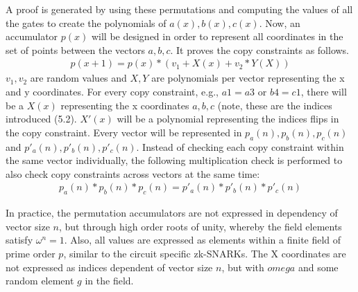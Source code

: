 A proof is generated by using these permutations and computing the values of all the gates to create the polynomials of \(a(x), b(x), c(x)\). Now, an accumulator \(p(x)\) will be designed in order to represent all coordinates in the set of points between the vectors \(a, b, c\). It proves the copy constraints as follows.
\begin{align}
    p(x+1) = p(x) * (v_1 + X(x) + v_2 * Y(X))
\end{align}
\(v_1, v_2\) are random values and \(X, Y\) are polynomials per vector representing the x and y coordinates. For every copy constraint, e.g., \(a1=a3\) or \(b4=c1\), there will be a \(X(x)\) representing the x coordinates \(a,b ,c\) (note, these are the indices introduced (5.2). \(X'(x)\) will be a polynomial representing the indices flips in the copy constraint. Every vector will be represented in \(p_{a}(n), p_{b}(n), p_{c}(n)\) and \(p'_{a}(n), p'_{b}(n), p'_{c}(n)\). Instead of checking each copy constraint within the same vector individually, the following multiplication check is performed to also check copy constraints across vectors at the same time:
\begin{align}
    p_{a}(n) * p_{b}(n) * p_{c}(n) = p'_{a}(n) * p'_{b}(n) * p'_{c}(n)
\end{align}

In practice, the permutation accumulators are not expressed in dependency of vector size \(n\), but through high order roots of unity, whereby the field elements satisfy \(\omega^n = 1\). Also, all values are expressed as elements within a finite field of prime order \(p\), similar to the circuit specific zk-SNARKs. The X coordinates are not expressed as indices dependent of vector size \(n\), but with \(omega\) and some random element \(g\) in the field.

